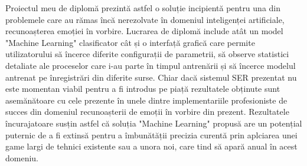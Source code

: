 \documentclass[a4paper,12pt]{book}
\begin{document}
		
		Proiectul meu de diplomă prezintă astfel o soluție incipientă pentru una din problemele care au rămas încă nerezolvate în domeniul inteligenței artificiale, recunoașterea emoției în vorbire. Lucrarea de diplomă include atât un model "Machine Learning" clasificator cât și o interfață grafică care permite utilizatorului să încerce diferite configurații de parametrii, să observe statistici detaliate ale proceselor care i-au parte în timpul antrenării și să încerce modelul antrenat pe înregistrări din diferite surse. Chiar dacă sistemul SER prezentat nu este momentan viabil pentru a fi introdus pe piață rezultatele obținute sunt asemănătoare cu cele prezente în unele dintre implementariile profesioniste de succes din domeniul recunoașterii de emoții în vorbire din prezent. Rezultatele încurajatoare susțin astfel că soluția "Machine Learning" propusă are un potențial puternic de a fi extinsă pentru a îmbunătății precizia curentă prin aplciarea unei game largi de tehnici existente sau a unora noi, care tind să apară anual în acest domeniu. 
		
		\renewcommand{\clearpage}{}
		\printbibliography[title={Bibliografie},notcategory=cited,resetnumbers=true]
		\printbibliography[title={Referinte},category=cited,resetnumbers=true]
		\newpage
\end{document}
